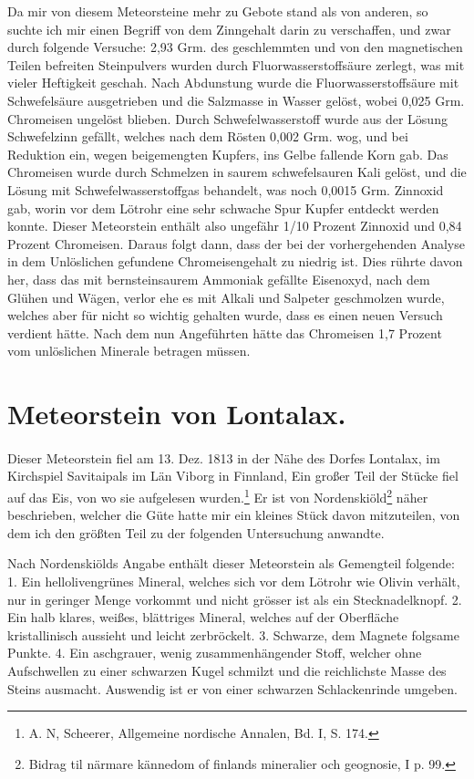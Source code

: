 \documentclass[a4paper, 11pt, oneside]{article}
\begin{document}
Da mir von diesem Meteorsteine mehr zu Gebote stand als von anderen, so suchte ich mir einen Begriff von dem Zinngehalt darin zu verschaffen, und zwar durch folgende Versuche: 2,93 Grm. des geschlemmten und von den magnetischen Teilen befreiten Steinpulvers wurden durch Fluorwasserstoffsäure zerlegt, was mit vieler Heftigkeit geschah. Nach Abdunstung wurde die Fluorwasserstoffsäure mit Schwefelsäure ausgetrieben und die Salzmasse in Wasser gelöst, wobei 0,025 Grm. Chromeisen ungelöst blieben. Durch Schwefelwasserstoff wurde aus der Lösung Schwefelzinn gefällt, welches nach dem Rösten 0,002 Grm. wog, und bei Reduktion ein, wegen beigemengten Kupfers, ins Gelbe fallende Korn gab. Das Chromeisen wurde durch Schmelzen in saurem schwefelsauren Kali gelöst, und die Lösung mit Schwefelwasserstoffgas behandelt, was noch 0,0015 Grm. Zinnoxid gab, worin vor dem Lötrohr eine sehr schwache Spur Kupfer entdeckt werden konnte. Dieser Meteorstein enthält also ungefähr 1/10 Prozent Zinnoxid und 0,84 Prozent Chromeisen. Daraus folgt dann, dass der bei der vorhergehenden Analyse in dem Unlöslichen gefundene Chromeisengehalt zu niedrig ist. Dies rührte davon her, dass das mit bernsteinsaurem Ammoniak gefällte Eisenoxyd, nach dem Glühen und Wägen, verlor ehe es mit Alkali und Salpeter geschmolzen wurde, welches aber für nicht so wichtig gehalten wurde, dass es einen neuen Versuch verdient hätte. Nach dem nun Angeführten hätte das Chromeisen 1,7 Prozent vom unlöslichen Minerale betragen müssen.

\section{Meteorstein von Lontalax.}
\paragraph{}
Dieser Meteorstein fiel am 13. Dez. 1813 in der Nähe des Dorfes Lontalax, im Kirchspiel Savitaipals im Län Viborg in Finnland, Ein großer Teil der Stücke fiel auf das Eis, von wo sie aufgelesen wurden.\footnote{A. N, Scheerer, Allgemeine nordische Annalen, Bd. I, S. 174.} Er ist von Nordenskiöld\footnote{Bidrag til närmare kännedom of finlands mineralier och geognosie, I p. 99.} näher beschrieben, welcher die Güte hatte mir ein kleines Stück davon mitzuteilen, von dem ich den größten Teil zu der folgenden Untersuchung anwandte.

Nach Nordenskiölds Angabe enthält dieser Meteorstein als Gemengteil folgende: 1. Ein hellolivengrünes Mineral, welches sich vor dem Lötrohr wie Olivin verhält, nur in geringer Menge vorkommt und nicht grösser ist als ein Stecknadelknopf. 2. Ein halb klares, weißes, blättriges Mineral, welches auf der Oberfläche kristallinisch aussieht und leicht zerbröckelt. 3. Schwarze, dem Magnete folgsame Punkte. 4. Ein aschgrauer, wenig zusammenhängender Stoff, welcher ohne Aufschwellen zu einer schwarzen Kugel schmilzt und die reichlichste Masse des Steins ausmacht. Auswendig ist er von einer schwarzen Schlackenrinde umgeben.
\end{document}
